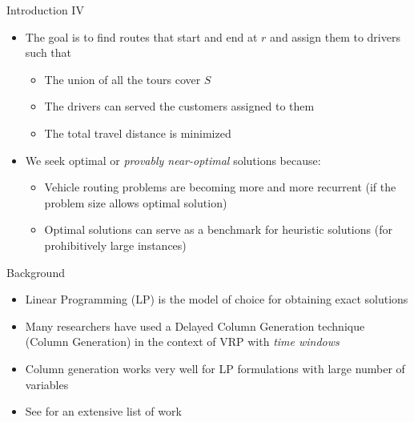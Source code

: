 \documentclass[10pt]{beamer}
\begin{document}
\begin{frame}{Introduction IV}
\begin{itemize}
    \item<1-> The goal is to find routes that start and end at $r$ and assign them to drivers such that
    \begin{itemize}
        \item<2-> The union of all the tours cover $S$
        \item<3-> The drivers can served the customers assigned to them
        \item<4-> The total travel distance is minimized
    \end{itemize}
    \item<5-> We seek optimal or \emph{provably near-optimal } solutions because:
        \begin{itemize}
            \item<6-> Vehicle routing problems are becoming more and more recurrent (if the problem size allows optimal solution)
            \item<7-> Optimal solutions can serve as a benchmark for heuristic solutions (for prohibitively large instances)
        \end{itemize}
\end{itemize}
\end{frame}


\begin{frame}{Background}
\begin{itemize}
    \item<1-> Linear Programming (LP) is the model of choice for obtaining exact solutions
    \item<2-> Many researchers have used a \alert{Delayed Column Generation} technique (Column Generation) in the context of VRP with \emph{time windows}
    \item<3-> Column generation works very well for LP formulations with large number of variables
    \item<4-> See \cite{DDS05} for an extensive list of work
\end{itemize}
\end{frame}
\end{document}
